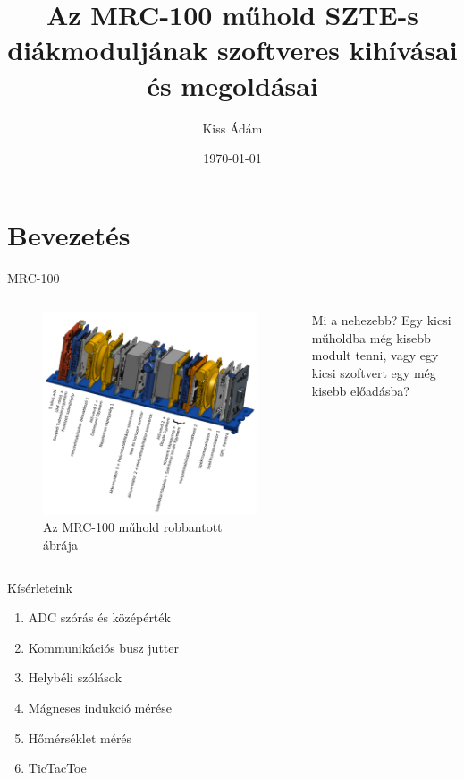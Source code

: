 \documentclass[aspectratio=169,xcolor=dvipsnames]{beamer}
\title[short title]{Az MRC-100 műhold SZTE-s diákmoduljának szoftveres kihívásai és megoldásai} %
\subtitle{}
\author[Kiss Ádám] {Kiss Ádám}
\institute[NTU] %
{
SZTE Móra Ferenc Szakkollégium\\
SZTE Elméleti Orvostudományok Doktori Iskola\\
SZTE SZAOK Élettani Intézet -- Szenzomotoros kutatólaboratórium
    \vskip 3pt
}
\date{\today} %
\begin{document}

\begin{frame}
    \titlepage
\end{frame}

\section{Bevezetés}
\begin{frame}{MRC-100}
\begin{columns}[c] 
	\begin{figure}
		\includegraphics[width=0.95\linewidth,angle=270]{mrc100}
		\caption{Az MRC-100 műhold robbantott ábrája}
	\end{figure}
	\pause
	Mi a nehezebb? Egy kicsi műholdba még kisebb modult tenni, vagy egy kicsi szoftvert egy még kisebb előadásba?
	\end{columns}
\end{frame}

\begin{frame}{Kísérleteink}
	\begin{enumerate}
		\item ADC szórás és középérték
		\item Kommunikációs busz jutter
		\item Helybéli szólások
		\item Mágneses indukció mérése
		\item Hőmérséklet mérés
		\item TicTacToe
	\end{enumerate}
\end{frame}
\end{document}
